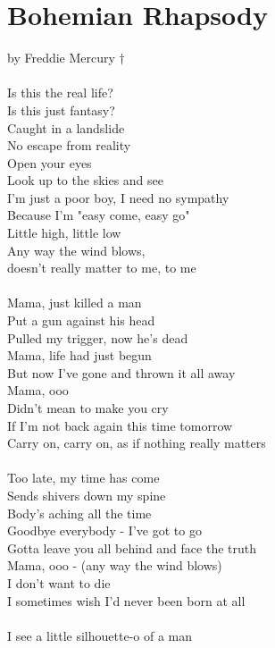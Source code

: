 \chapter{Bohemian Rhapsody}

by Freddie Mercury $\dagger$ \citep{TheRealLife} \\
\\
Is this the real life? \\
Is this just fantasy? \\
Caught in a landslide \\
No escape from reality \\
Open your eyes \\
Look up to the skies and see \\
I'm just a poor boy, I need no sympathy \\
Because I'm "easy come, easy go" \\
Little high, little low \\
Any way the wind blows, \\
doesn't really matter to me, 
to me \\
\\
Mama, just killed a man \\
Put a gun against his head \\
Pulled my trigger, now he's dead \\
Mama, life had just begun \\
But now I've gone and thrown it all away \\
Mama, ooo \\
Didn't mean to make you cry \\
If I'm not back again this time tomorrow \\
Carry on, carry on, as if nothing really matters \\
\\
Too late, my time has come \\
Sends shivers down my spine \\
Body's aching all the time \\
Goodbye everybody - I've got to go \\
Gotta leave you all behind and face the truth \\
Mama, ooo - (any way the wind blows) \\
I don't want to die \\
I sometimes wish I'd never been born at all \\
\\
I see a little silhouette-o of a man \\
